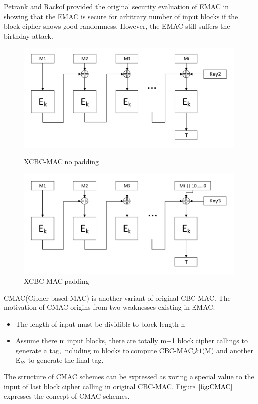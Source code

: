 \documentclass{article}
\begin{document}
Petrank and Rackof provided the original security evaluation of EMAC in \cite{emac} showing that the EMAC is secure for arbitrary number of input blocks if the block cipher shows good randomness. However, the EMAC still suffers the birthday attack.


\begin{figure}[htbp]
\centering
\includegraphics[scale=0.5]{./diagrams/xcbc-nopadding.pdf}
\caption{XCBC-MAC no padding}
\centering
\includegraphics[scale=0.5]{./diagrams/xcbc-padding.pdf}
\caption{XCBC-MAC padding}
\label{fig:XCBC}
\end{figure}
CMAC(Cipher based MAC) is another variant of original CBC-MAC. The motivation of CMAC origins from two weaknesses existing in EMAC:
\begin{itemize}
	\item The length of input must be dividible to block length n
	\item Assume there m input blocks, there are totally m+1 block cipher callings to generate a tag, including m blocks to compute CBC-MAC$\_{k1}$(M) and another E$_{k2}$ to generate the final tag. 
\end{itemize}
The structure of CMAC schemes can be expressed as xoring a special value to the input of last block cipher calling in original CBC-MAC. Figure $\ref{fig:CMAC}$ expresses the concept of CMAC schemes.
	
\end{document}
